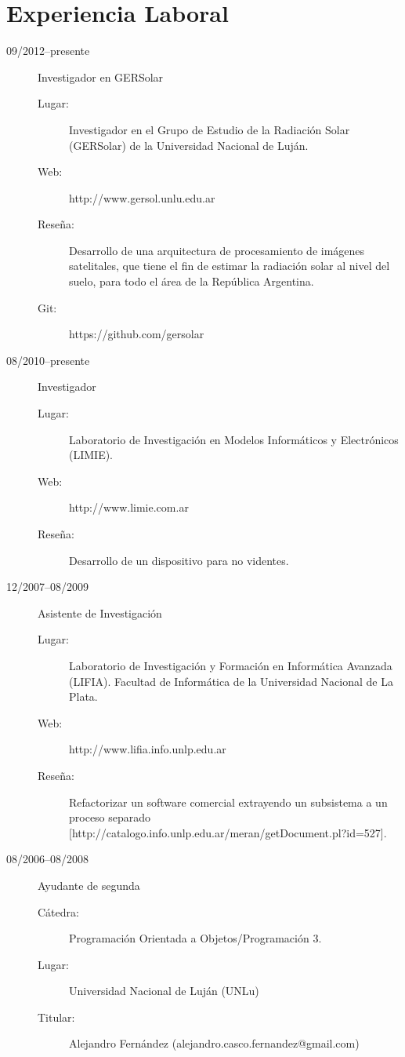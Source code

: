 \documentclass[a4paper]{article}
\begin{document}
\section{Experiencia Laboral}
\begin{description}
\item[09/2012--presente] Investigador en GERSolar
	\begin{description}
	\item[Lugar: ] Investigador en el Grupo de Estudio de la Radiación Solar (GERSolar) de la Universidad Nacional de Luján.
	\item[Web: ] http://www.gersol.unlu.edu.ar
	\item[Reseña: ]  Desarrollo de una arquitectura de procesamiento de imágenes satelitales, que tiene el fin  de estimar la radiación solar al nivel del suelo, para todo el área de la República Argentina.
	\item[Git: ] https://github.com/gersolar
	\end{description}
\item[08/2010--presente] Investigador
	\begin{description}
	\item[Lugar: ] Laboratorio de Investigación en Modelos Informáticos y Electrónicos (LIMIE).
	\item[Web: ] http://www.limie.com.ar
	\item[Reseña: ] Desarrollo de un dispositivo para no videntes.
	\end{description}
\item[12/2007--08/2009] Asistente de Investigación
	\begin{description}
	\item[Lugar: ] Laboratorio de Investigación y Formación en Informática Avanzada (LIFIA). Facultad de Informática de la Universidad Nacional de La Plata.
	\item[Web: ] http://www.lifia.info.unlp.edu.ar
	\item[Reseña: ] Refactorizar un software comercial extrayendo un subsistema a un proceso separado [http://catalogo.info.unlp.edu.ar/meran/getDocument.pl?id=527].
	\end{description}
\item[08/2006--08/2008] Ayudante de segunda
	\begin{description}
	\item[Cátedra: ] Programación Orientada a Objetos/Programación 3.
	\item[Lugar: ] Universidad Nacional de Luján (UNLu)
	\item[Titular: ] Alejandro Fernández (alejandro.casco.fernandez@gmail.com)

\end{description}
\end{description}
\end{document}

